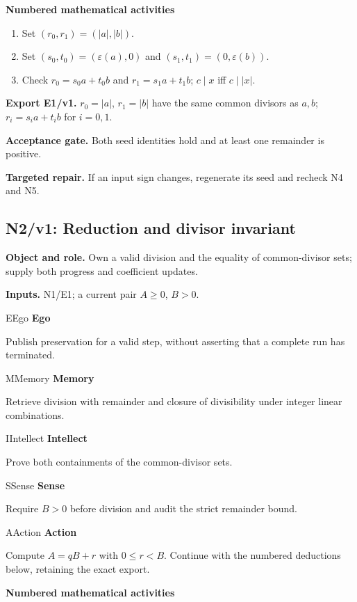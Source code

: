 \documentclass[preprint,12pt,aps,pra,showkeys,amsmath,amssymb,superscriptaddress,floatfix]{revtex4-2}
\theoremstyle{definition}
\theoremstyle{remark}
\newcommand{\mmfaculty}[3]{%
 \begin{mmfacultybox}{#1}{#2}
 {\sffamily\bfseries\color{MMBlue}#2}\par\smallskip #3
 \end{mmfacultybox}}
\newcommand{\field}[2]{\par\smallskip\noindent\textbf{#1.} #2\par}
\begin{document}
\smallskip\noindent\textbf{Numbered mathematical activities}

\begin{enumerate}[label=N1.\arabic*,leftmargin=3.4em]

\item Set \((r_0,r_1)=(|a|,|b|)\).

\item Set \((s_0,t_0)=(\varepsilon(a),0)\) and
\((s_1,t_1)=(0,\varepsilon(b))\).

\item Check \(r_0=s_0a+t_0b\) and \(r_1=s_1a+t_1b\); \(c\mid x\) iff
\(c\mid|x|\).

\end{enumerate}

\field{Export E1/v1}{\(r_0=|a|\), \(r_1=|b|\) have the same common divisors as \(a,b\);
\(r_i=s_i a+t_i b\) for \(i=0,1\).}

\field{Acceptance gate}{Both seed identities hold and at least one remainder is positive.}

\field{Targeted repair}{If an input sign changes, regenerate its seed and recheck N4 and N5.}

\clearpage

\subsection{N2/v1: Reduction and divisor invariant}

\field{Object and role}{Own a valid division and the equality of common-divisor sets; supply
both progress and coefficient updates.}

\field{Inputs}{N1/E1; a current pair \(A\ge0\), \(B>0\).}

\mmfaculty{E}{Ego}{Publish preservation for a valid step, without asserting that a complete
run has terminated.}

\mmfaculty{M}{Memory}{Retrieve division with remainder and closure of divisibility under
integer linear combinations.}

\mmfaculty{I}{Intellect}{Prove both containments of the common-divisor sets.}

\mmfaculty{S}{Sense}{Require \(B>0\) before division and audit the strict remainder bound.}

\mmfaculty{A}{Action}{Compute \(A=qB+r\) with \(0\le r<B\). Continue with the numbered
deductions below, retaining the exact export.}

\smallskip\noindent\textbf{Numbered mathematical activities}
\end{document}
